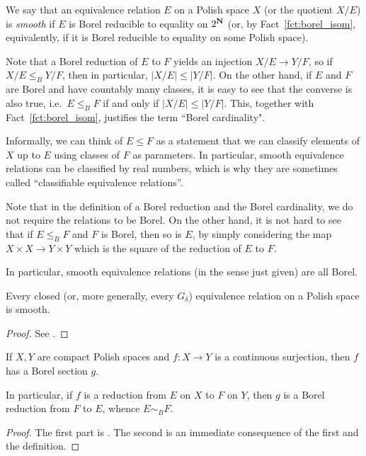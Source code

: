 	
	\begin{dfn}
		\label{dfn:smt}
		We say that an equivalence relation $E$ on a Polish space $X$ (or the quotient $X/E$) is {\em smooth} if $E$ is Borel reducible to equality on $2^{\mathbf{N}}$ (or, by Fact~\ref{fct:borel_isom}, equivalently, if it is Borel reducible to equality on some Polish space).
		\xqed{\lozenge}
	\end{dfn}
	
	
	Note that a Borel reduction of $E$ to $F$ yields an injection $X/E\to Y/F$, so if $X/E\leq_B Y/F$, then in particular, $\lvert X/E\rvert\leq \lvert Y/F\rvert$. On the other hand, if $E$ and $F$ are Borel and have countably many classes, it is easy to see that the converse is also true, i.e.\ $E\leq_B F$ if and only if $\lvert X/E\rvert\leq \lvert Y/F\rvert$. This, together with Fact~\ref{fct:borel_isom}, justifies the term ``Borel cardinality".
	
	Informally, we can think of $E\leq F$ as a statement that we can classify elements of $X$ up to $E$ using classes of $F$ as parameters. In particular, smooth equivalence relations can be classified by real numbers, which is why they are sometimes called ``classifiable equivalence relations''.
	
	
	\begin{rem}
		\label{rem:smooth_implies_borel}
		Note that in the definition of a Borel reduction and the Borel cardinality, we do not require the relations to be Borel. On the other hand, it is not hard to see that if $E\leq_B F$ and $F$ is Borel, then so is $E$, by simply considering the map $X\times X\to Y\times Y$ which is the square of the reduction of $E$ to $F$.
		
		In particular, smooth equivalence relations (in the sense just given) are all Borel.
		\xqed{\lozenge}
	\end{rem}
	
	\begin{fct}
		\label{fct:clsd_smth}
		Every closed (or, more generally, every $G_\delta$) equivalence relation on a Polish space is smooth.
	\end{fct}
	\begin{proof}
		See \cite[Corollary 1.2]{HKL90}.
	\end{proof}
	
	
	\begin{fct}
		\label{fct:borel_section}
		If $X,Y$ are compact Polish spaces and $f\colon X\to Y$ is a continuous surjection, then $f$ has a Borel section $g$.
		
		In particular, if $f$ is a reduction from $E$ on $X$ to $F$ on $Y$, then $g$ is a Borel reduction from $F$ to $E$, whence $E\sim_B F$.
	\end{fct}
	\begin{proof}
		The first part is \cite[Exercise 24.20]{Kec95}. The second is an immediate consequence of the first and the definition.
	\end{proof}
	
